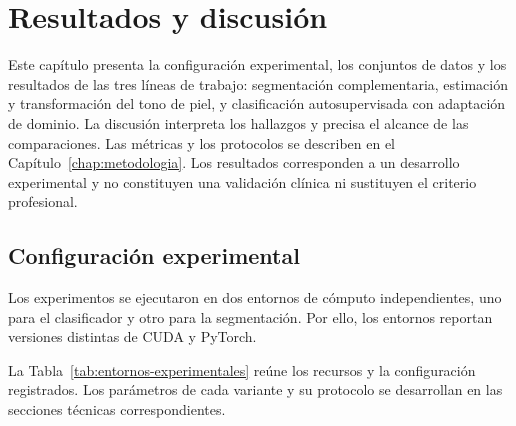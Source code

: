 \chapter{Resultados y discusión}\label{chap:resultados}

Este capítulo presenta la configuración experimental, los conjuntos de datos y los resultados de las tres líneas de trabajo: segmentación complementaria, estimación y transformación del tono de piel, y clasificación autosupervisada con adaptación de dominio. La discusión interpreta los hallazgos y precisa el alcance de las comparaciones. Las métricas y los protocolos se describen en el Capítulo~\ref{chap:metodologia}. Los resultados corresponden a un desarrollo experimental y no constituyen una validación clínica ni sustituyen el criterio profesional.

\section{Configuración experimental}

Los experimentos se ejecutaron en dos entornos de cómputo independientes, uno para el clasificador y otro para la segmentación. Por ello, los entornos reportan versiones distintas de CUDA y PyTorch.

La Tabla~\ref{tab:entornos-experimentales} reúne los recursos y la configuración registrados. Los parámetros de cada variante y su protocolo se desarrollan en las secciones técnicas correspondientes.

